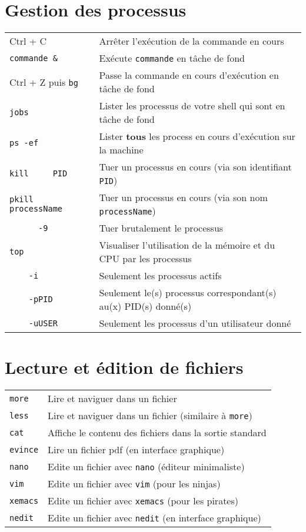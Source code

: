 \documentclass [a4paper]{article}
\begin{document}
\section*{Gestion des processus}

\begin{tabular}{ ll }
\hline
{Ctrl + C}                          & Arrêter l'exécution de la commande en cours \\
\verb+commande &+                   & Exécute \verb+commande+ en tâche de fond \\
{Ctrl + Z puis \verb+bg+}           & Passe la commande en cours d'exécution en tâche de fond \\
{\verb+jobs+}                       & Lister les processus de votre shell qui sont en tâche de fond \\        
{\verb+ps -ef+}                     & Lister \textbf{tous} les process en cours d'exécution sur la machine \\
{\verb+kill     PID+}               & Tuer un processus en cours (via son identifiant \verb+PID+)\\
{\verb+pkill    processName+}       & Tuer un processus en cours (via son nom \verb+processName+)\\
{\verb+      -9  + }                & Tuer brutalement le processus\\
{\verb+top+}                        & Visualiser l'utilisation de la mémoire et du CPU par les processus\\
{\verb+    -i +}                    & Seulement les processus actifs\\
{\verb+    -pPID+}                  & Seulement le(s) processus correspondant(s) au(x) PID(s) donné(s)\\
{\verb+    -uUSER+}                 & Seulement les processus d'un utilisateur donné\\

\hline
\end{tabular}


\section*{Lecture et édition de fichiers}

\begin{tabular}{ ll }
\hline
{\verb+more+}   & Lire et naviguer dans un fichier\\
{\verb+less+}   & Lire et naviguer dans un fichier (similaire à \verb+more+)\\
{\verb+cat+}    & Affiche le contenu des fichiers dans la sortie standard\\
{\verb+evince+} & Lire un fichier pdf (en interface graphique)\\
{\verb+nano+}   & Edite un fichier avec \verb+nano+ (éditeur minimaliste)\\
{\verb+vim+}    & Edite un fichier avec \verb+vim+ (pour les ninjas)\\
{\verb+xemacs+} & Edite un fichier avec \verb+xemacs+ (pour les pirates)\\
{\verb+nedit+}  & Edite un fichier avec \verb+nedit+ (en interface graphique)\\
\hline
\end{tabular}
\end{document}
